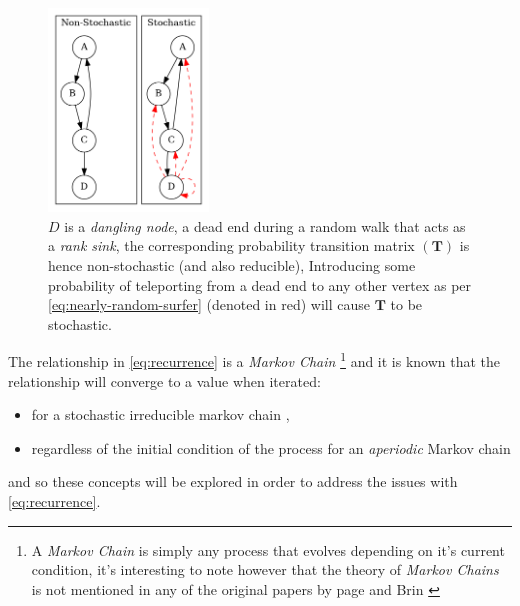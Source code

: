 \documentclass[11pt]{report}
\begin{document}
\begin{figure}
    \includegraphics[width=0.38\textwidth]{media/dot/stochastic_graph_example.dot.png}
    \caption{\label{fig:stochastic-example}\(D\) is a \emph{dangling node}, a dead end during a random walk that acts as a \textit{rank sink}, the corresponding probability transition matrix \((\mathbf{T})\) is hence non-stochastic (and also reducible), Introducing some probability of teleporting from a dead end to any other vertex as per \eqref{eq:nearly-random-surfer} (denoted in red) will cause \(\mathbf{T}\) to be stochastic.}
\end{figure}

The relationship in \eqref{eq:recurrence} is a \emph{Markov Chain} \footnote{A \emph{Markov Chain} is
simply any process that evolves depending on it's current condition, it's
interesting to note however that the theory of \emph{Markov Chains} is not mentioned in any
of the original papers by page and Brin
\cite[]{langvilleGooglePageRankScience2012}}  and it is known
that the relationship will converge to a value when iterated:

\begin{itemize}
\item for a stochastic irreducible markov chain \cite[.5]{larsonElementaryLinearAlgebra1991},
\item regardless of the initial condition of the process for an \emph{aperiodic} Markov chain \cite[]{langvilleGooglePageRankScience2012}
\end{itemize}

and so these concepts will be explored in order to address the issues with \eqref{eq:recurrence}.
\end{document}
